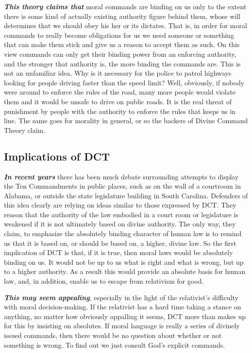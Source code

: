 \documentclass[12pt, openany]{book}
\begin{document}
\textbf{\emph{This theory claims that}} moral commands are binding on us only to the extent there is some kind of actually existing authority figure behind them, whose will determines that we should obey his her or its dictates. That is, in order for moral commands to really become obligations for us we need someone or something that can make them stick and give us a reason to accept them as such. On this view commands can only get their binding power from an enforcing authority, and the stronger that authority is, the more binding the commands are. This is not an unfamiliar idea. Why is it necessary for the police to patrol highways looking for people driving faster than the speed limit? Well, obviously, if nobody were around to enforce the rules of the road, many more people would violate them and it would be unsafe to drive on public roads. It is the real threat of punishment by people with the authority to enforce the rules that keeps us in line. The same goes for morality in general, or so the backers of Divine Command Theory claim.

\hypertarget{implications-of-dct}{%
\subsection*{Implications of DCT}\label{implications-of-dct}}


\textbf{\emph{In recent years}} there has been much debate surrounding attempts to display the Ten Commandments in public places, such as on the wall of a courtroom in Alabama, or outside the state legislature building in South Carolina. Defenders of this idea clearly are relying on ideas similar to those expressed by DCT. They reason that the authority of the law embodied in a court room or legislature is weakened if it is not ultimately based on divine authority. The only way, they claim, to emphasize the absolutely binding character of human law is to remind us that it is based on, or should be based on, a higher, divine law. So the first implication of DCT is that, if it is true, then moral laws would be absolutely binding on us. It would not be up to us what is right and what is wrong, but up to a higher authority. As a result this would provide an absolute basis for human law, and, in addition, enable us to escape from relativism for good.

\textbf{\emph{This may seem appealing}}, especially in the light of the relativist's difficulty with moral decision-making. If the relativist has a hard time taking a stance on anything, no matter how obviously appalling it seems, DCT more than makes up for this by insisting on absolutes. If moral language is really a series of divinely issued commands, then there would be no question about whether or not something is wrong. To find out we just consult God's explicit commands.
\end{document}
